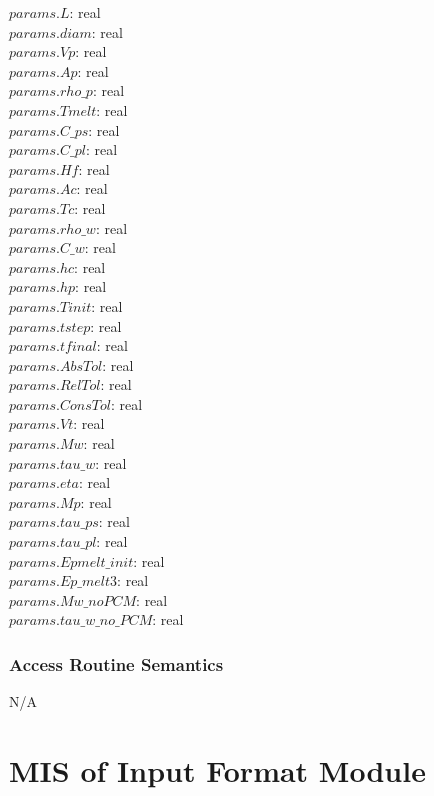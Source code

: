 \documentclass[12pt]{article}
\begin{document}
$params$.$L$: real \\
$params$.$diam$: real \\
$params$.$Vp$: real \\
$params$.$Ap$: real \\
$params$.$rho\_p$: real \\
$params$.$Tmelt$: real \\
$params$.$C\_ps$: real \\
$params$.$C\_pl$: real \\
$params$.$Hf$: real \\
$params$.$Ac$: real \\
$params$.$Tc$: real \\
$params$.$rho\_w$: real \\
$params$.$C\_w$: real \\
$params$.$hc$: real \\
$params$.$hp$: real \\
$params$.$Tinit$: real \\
$params$.$tstep$: real \\
$params$.$tfinal$: real \\
$params$.$AbsTol$: real \\
$params$.$RelTol$: real \\
$params$.$ConsTol$: real \\
$params$.$Vt$: real \\
$params$.$Mw$: real \\
$params$.$tau\_w$: real \\
$params$.$eta$: real \\
$params$.$Mp$: real \\
$params$.$tau\_ps$: real \\
$params$.$tau\_pl$: real \\
$params$.$Epmelt\_init$: real \\
$params$.$Ep\_melt3$: real \\ 
$params$.$Mw\_noPCM$: real \\
$params$.$tau\_w\_no\_PCM$: real

\subsubsection{Access Routine Semantics}

N/A

\section{MIS of Input Format Module} \label{Load}
\end{document}
